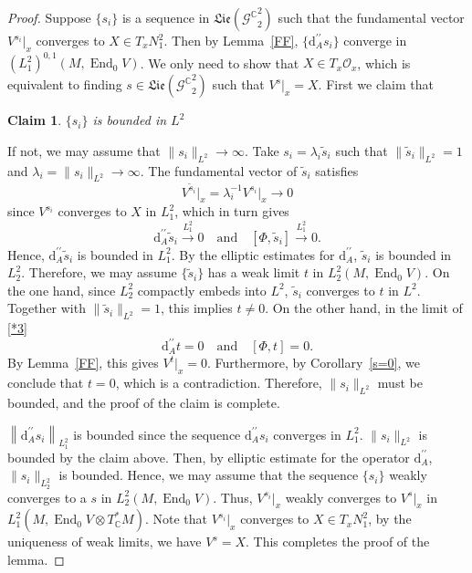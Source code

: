 \documentclass[a4paper]{amsart}
\newtheorem*{claim}{Claim}
\theoremstyle{definition}
\theoremstyle{remark}
\numberwithin{equation}{section}
\begin{document}
\begin{proof}
Suppose $\{s_i\}$ is a sequence in $\mathfrak{Lie}({\mathscr{G}^\mathbb{C}}_2^2)$ such that the fundamental vector $V^{s_i}|_x$ converges to $X \in T_x N_1^2$. Then by Lemma~\ref{FF}, $\{\mathrm{d}_A^{\prime\prime}s_i\}$ converge in $(L_1^2)^{0,1}(M, \operatorname{End}_0 V)$. We only need to show that $X \in T_x \mathcal{O}_x$, which is equivalent to finding $s \in \mathfrak{Lie}({\mathscr{G}^\mathbb{C}}_2^2)$ such that $V^s|_x=X$. First we claim that
\begin{claim}
\it $\{s_i\}$ is bounded in $L^2$
\end{claim}
If not, we may assume that $\|s_i\|_{L^2} \to \infty$. Take $s_i = \lambda_i \tilde{s}_i$ such that $\|\tilde{s}_i\|_{L^2} = 1$ and $\lambda_i = \|s_i\|_{L^2} \to \infty$. The fundamental vector of $\tilde s_i$ satisfies
\[
V^{\tilde{s}_i}\big|_x = \lambda_i^{-1} V^{s_i}\big|_x \to 0
\]
since $V^{s_i}$ converges to $X$ in $L_1^2$, which in turn gives
\begin{equation}
\mathrm{d}_A^{\prime\prime} \tilde{s}_i \xrightarrow{L_1^2} 0 \quad \text{and} \quad [\Phi, \tilde{s}_i] \xrightarrow{L_1^2} 0. \label{*3}
\end{equation}
Hence, $\mathrm{d}_A^{\prime\prime} \tilde{s}_i$ is bounded in $L_1^2$. By the elliptic estimates for $\mathrm{d}_A^{\prime\prime}$, $\tilde{s}_i$ is bounded in $L_2^2$. Therefore, we may assume $\{\tilde{s}_i\}$ has a weak limit $t$ in $L_2^2(M, \operatorname{End}_0 V)$. On the one hand, since $L_2^2$ compactly embeds into $L^2$, $\tilde{s}_i$ converges to $t$ in $L^2$. Together with $\|\tilde{s}_i\|_{L^2} = 1$, this implies $t \neq 0$. On the other hand, in the limit of \eqref{*3}
\[
\mathrm{d}_A^{\prime\prime} t = 0 \quad \text{and} \quad [\Phi, t] = 0.
\]
By Lemma~\ref{FF}, this gives $V^t|_x = 0$. Furthermore, by Corollary~\ref{s=0}, we conclude that $t = 0$, which is a contradiction. Therefore, $\|s_i\|_{L^2}$ must be bounded, and the proof of the claim is complete.

$\left\|\mathrm{d}_A^{\prime\prime}s_i\right\|_{L_1^2}$ is bounded since the sequence $\mathrm{d}_A^{\prime\prime}s_i$ converges in $L_1^2$. $\|s_i\|_{L^2}$ is bounded by the claim above. Then, by elliptic estimate for the operator $\mathrm{d}_A^{\prime\prime}$, $\|s_i\|_{L_2^2}$ is bounded. Hence, we may assume that the sequence $\{s_i\}$ weakly converges to a $s$ in $L_2^2(M, \operatorname{End}_0 V)$. Thus, $V^{s_i}|_x$ weakly converges to $V^s|_x$ in $L_1^2(M, \operatorname{End}_0 V \otimes T_\mathbb{C}^* M)$. Note that $V^{s_i}|_x$ converges to $X \in T_x N_1^2$, by the uniqueness of weak limits, we have $V^s = X$. This completes the proof of the lemma.
\end{proof}
\end{document}
